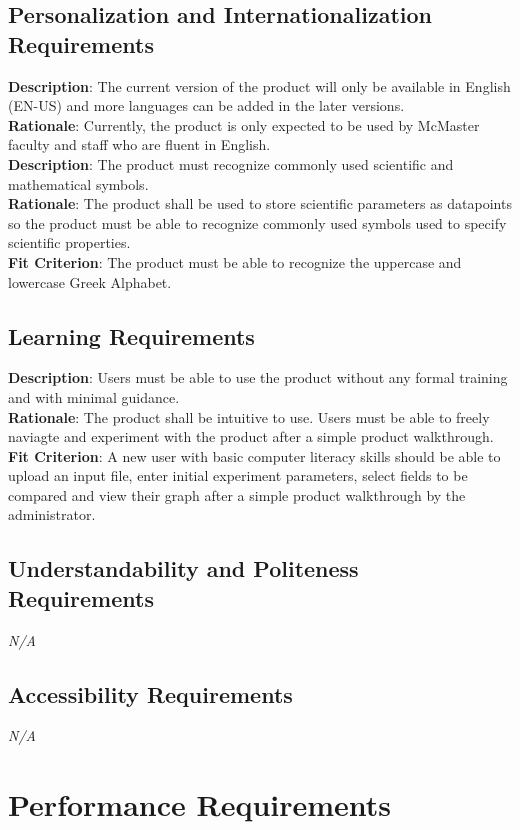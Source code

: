 \documentclass[12pt]{article}
\begin{document}
\subsection{Personalization and Internationalization Requirements}
\textbf{Description}: The current version of the product will only be available in English (EN-US) and more languages can be added in the later versions.\\
\textbf{Rationale}: Currently, the product is only expected to be used by McMaster faculty and staff who are fluent in English.\\
\newline
\textbf{Description}: The product must recognize commonly used scientific and mathematical symbols.\\
\textbf{Rationale}: The product shall be used to store scientific parameters as datapoints so the product must be able to recognize commonly used symbols used to specify scientific properties.\\
\textbf{Fit Criterion}: The product must be able to recognize the uppercase and lowercase Greek Alphabet.

\subsection{Learning Requirements}
\textbf{Description}: Users must be able to use the product without any formal training and with minimal guidance.\\
\textbf{Rationale}: The product shall be intuitive to use. Users must be able to freely naviagte and experiment with the product after a simple product walkthrough.\\
\textbf{Fit Criterion}: A new user with basic computer literacy skills should be able to upload an input file, enter initial experiment parameters, select fields to be compared and view their graph
after a simple product walkthrough by the administrator.

\subsection{Understandability and Politeness Requirements}
\emph{N/A}

\subsection{Accessibility Requirements}
\emph{N/A}

\section{Performance Requirements}
\end{document}

